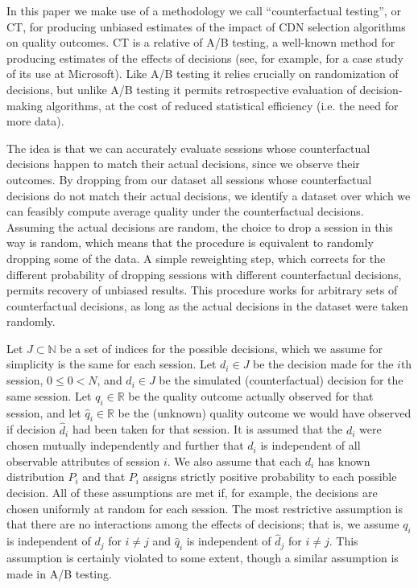 In this paper we make use of a methodology we call ``counterfactual testing'', or CT, for producing unbiased estimates of the impact of CDN selection algorithms on quality outcomes.  CT is a relative of A/B testing, a well-known method for producing estimates of the effects of decisions (see, for example, \cite{kohavi2009online} for a case study of its use at Microsoft).  Like A/B testing it relies crucially on randomization of decisions, but unlike A/B testing it permits retrospective evaluation of decision-making algorithms, at the cost of reduced statistical efficiency (i.e. the need for more data).  

The idea is that we can accurately evaluate sessions whose counterfactual decisions happen to match their actual decisions, since we observe their outcomes.  By dropping from our dataset all sessions whose counterfactual decisions do not match their actual decisions, we identify a dataset over which we can feasibly compute average quality under the counterfactual decisions.  Assuming the actual decisions are random, the choice to drop a session in this way is random, which means that the procedure is equivalent to randomly dropping some of the data.  A simple reweighting step, which corrects for the different probability of dropping sessions with different counterfactual decisions, permits recovery of unbiased results.  This procedure works for arbitrary sets of counterfactual decisions, as long as the actual decisions in the dataset were taken randomly.

Let $J \subset \mathbb{N}$ be a set of indices for the possible decisions, which we assume for simplicity is the same for each session.  Let $d_i \in J$ be the decision made for the $i$th session, $0 \leq 0 < N$, and $\hat{d}_i \in J$ be the simulated (counterfactual) decision for the same session.  Let $q_i \in \mathbb{R}$ be the quality outcome actually observed for that session, and let $\hat{q}_i \in \mathbb{R}$ be the (unknown) quality outcome we would have observed if decision $\hat{d}_i$ had been taken for that session.  It is assumed that the $d_i$ were chosen mutually independently and further that $d_i$ is independent of all observable attributes of session $i$.  We also assume that each $d_i$ has known distribution $P_i$ and that $P_i$ assigns strictly positive probability to each possible decision.  All of these assumptions are met if, for example, the decisions are chosen uniformly at random for each session.  The most restrictive assumption is that there are no interactions among the effects of decisions; that is, we assume $q_i$ is independent of $d_j$ for $i \neq j$ and $\hat{q}_i$ is independent of $\hat{d}_j$ for $i \neq j$.  This assumption is certainly violated to some extent, though a similar assumption is made in A/B testing.

